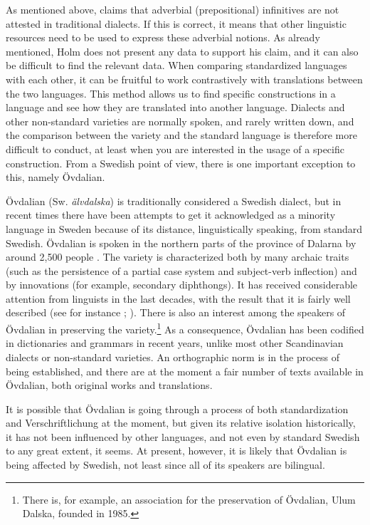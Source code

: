 \documentclass[output=paper]{langscibook}
\begin{document}
As mentioned above, \citet[27]{Holm1967} claims that adverbial (prepositional) infinitives are not attested in traditional dialects. If this is correct, it means that other linguistic resources need to be used to express these adverbial notions. As already mentioned, Holm does not present any data to support his claim, and it can also be difficult to find the relevant data. When comparing standardized languages with each other, it can be fruitful to work contrastively with translations between the two languages. This method allows us to find specific constructions in a language and see how they are translated into another language. Dialects and other non-standard varieties are normally spoken, and rarely written down, and the comparison between the variety and the standard language is therefore more difficult to conduct, at least when you are interested in the usage of a specific construction. From a Swedish point of view, there is one important exception to this, namely Övdalian. 

Övdalian (Sw. \textit{älvdalska}) is traditionally considered a Swedish dialect, but in recent times there have been attempts to get it acknowledged as a minority language in Sweden because of its distance, linguistically speaking, from standard Swedish. Övdalian is spoken in the northern parts of the province of Dalarna by around 2,500 people \citep[27]{Garbacz2009}. The variety is characterized both by many archaic traits (such as the persistence of a partial case system and subject-verb inflection) and by innovations (for example, secondary diphthongs). It has received considerable attention from linguists in the last decades, with the result that it is fairly well described (see for instance \citealt{Garbacz2009}; \citealt{BentzenEtAl2015}). There is also an interest among the speakers of Övdalian in preserving the variety.\footnote{There is, for example, an association for the preservation of Övdalian, Ulum Dalska, founded in 1985.} As a consequence, Övdalian has been codified in dictionaries and grammars in recent years, unlike most other Scandinavian dialects or non-standard varieties. An orthographic norm is in the process of being established, and there are at the moment a fair number of texts available in Övdalian, both original works and translations. 

It is possible that Övdalian is going through a process of both standardization and Verschriftlichung at the moment, but given its relative isolation historically, it has not been influenced by other languages, and not even by standard Swedish to any great extent, it seems. At present, however, it is likely that Övdalian is being affected by Swedish, not least since all of its speakers are bilingual. 
\end{document}
